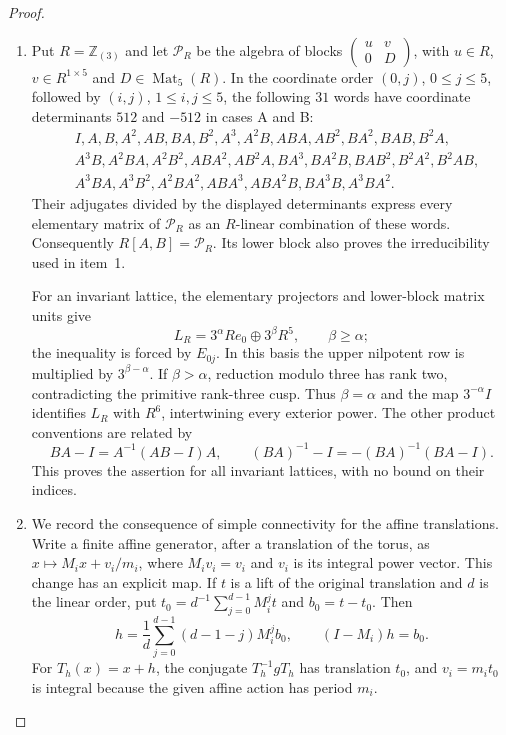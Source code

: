 \begin{proof}
\begin{enumerate}[label={$\langle1\rangle$\arabic*.}]
\item Put $R=\mathbb Z_{(3)}$ and let $\mathcal P_R$ be the algebra
of blocks $\left(\begin{smallmatrix}u&v\\0&D\end{smallmatrix}\right)$,
with $u\in R$, $v\in R^{1\times5}$ and $D\in\operatorname{Mat}_5(R)$.
In the coordinate order $(0,j)$, $0\leq j\leq5$, followed by
$(i,j)$, $1\leq i,j\leq5$, the following $31$ words have coordinate
determinants $512$ and $-512$ in cases A and B:
\[
\begin{aligned}
&I,A,B,A^2,AB,BA,B^2,A^3,A^2B,ABA,AB^2,BA^2,BAB,B^2A,\\
&A^3B,A^2BA,A^2B^2,ABA^2,AB^2A,BA^3,BA^2B,BAB^2,B^2A^2,B^2AB,\\
&A^3BA,A^3B^2,A^2BA^2,ABA^3,ABA^2B,BA^3B,A^3BA^2.
\end{aligned}
\]
Their adjugates divided by the displayed determinants express
every elementary matrix of $\mathcal P_R$ as an $R$-linear
combination of these words.  Consequently $R[A,B]=\mathcal P_R$.
Its lower block also proves the irreducibility used in item~1.

For an invariant lattice, the elementary projectors and lower-block
matrix units give
\[
 L_R=3^\alpha Re_0\oplus3^\beta R^5,\qquad \beta\geq\alpha;
\]
the inequality is forced by $E_{0j}$.  In this basis the upper
nilpotent row is multiplied by $3^{\beta-\alpha}$.  If
$\beta>\alpha$, reduction modulo three has rank two, contradicting
the primitive rank-three cusp.  Thus $\beta=\alpha$ and the map $3^{-\alpha}I$ identifies $L_R$ with $R^6$, intertwining every
exterior power.  The other product conventions are related by
\[
 BA-I=A^{-1}(AB-I)A,\qquad
 (BA)^{-1}-I=-(BA)^{-1}(BA-I).
\]
This proves the assertion for all invariant lattices, with no
bound on their indices.

\item We record the consequence of simple connectivity for the
affine translations.  Write a finite affine generator,
after a translation of the torus, as
$x\mapsto M_ix+v_i/m_i$, where $M_iv_i=v_i$ and $v_i$ is its
integral power vector.  This change has an explicit map.  If $t$
is a lift of the original translation and $d$ is the linear order,
put $t_0=d^{-1}\sum_{j=0}^{d-1}M_i^jt$ and $b_0=t-t_0$.
Then
\[
 h=\frac1d\sum_{j=0}^{d-1}(d-1-j)M_i^jb_0,
 \qquad (I-M_i)h=b_0.
\]
For $T_h(x)=x+h$, the conjugate $T_h^{-1}gT_h$ has translation $t_0$, and
$v_i=m_it_0$ is integral because the given affine action has
period $m_i$.


\end{enumerate}
\end{proof}
